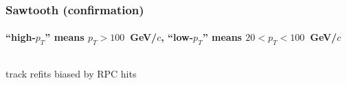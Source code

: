 \documentclass[compress]{beamer}
\begin{document}
\begin{frame}
\frametitle{Sawtooth (confirmation)}
\framesubtitle{``high-$p_T$'' means $p_T > 100$~GeV/$c$, ``low-$p_T$'' means $20 < p_T < 100$~GeV/$c$}


\begin{columns}
\begin{center}
track refits biased by RPC hits
\end{center}



\end{columns}
\end{frame}
\end{document}
